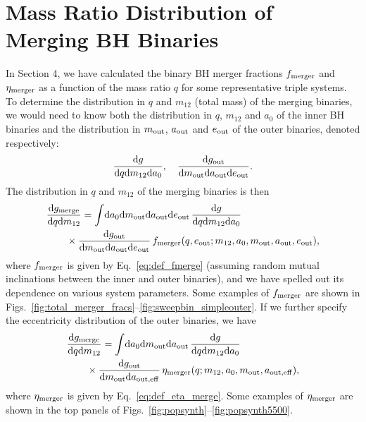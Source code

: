 \documentclass[
        fleqn,
        usenatbib,
    ]{mnras}
\newcommand*{\md}[0]{\mathrm{d}}
\begin{document}
\section{Mass Ratio Distribution of Merging BH Binaries}\label{s:q_dist}

In Section 4, we have calculated the binary BH merger fractions $f_{\rm merger}$
and $\eta_{\rm merger}$ as a function of the mass ratio $q$ for some
representative triple systems. To determine the distribution in $q$ and $m_{12}$
(total mass) of the merging binaries, we would need to know both the
distribution in $q$, $m_{12}$ and $a_0$ of the inner BH binaries and the
distribution in $m_{\rm out}$, $a_{\rm out}$ and $e_{\rm out}$ of the outer
binaries, denoted respectively:
\begin{equation}
    \frac{\md g}{ \md q \md m_{12} \md a_0},\quad
    \frac{\md g_{\rm out}}{ \md m_{\rm out} \md a_{\rm out} \md e_{\rm out}}.
\end{equation}
The distribution in $q$ and $m_{12}$ of the merging binaries is then
\begin{align}
    & {\md g_{\rm merge}\over \md q \md m_{12}} = \int \!\md a_0 \md m_{\rm
        out}\md a_{\rm out}\md e_{\rm out}\, {\md g\over \md q \md m_{12} \md
        a_0}\nonumber\\
    &\qquad \times {\md g_{\rm out}\over \md m_{\rm out} \md a_{\rm out} \md  e_{\rm out}}\,
      f_{\rm merger}(q,e_{\rm out}; m_{12},a_0,m_{\rm out},a_{\rm out},e_{\rm out}),
      \label{eq:dong1}
\end{align}
where $f_{\rm merger}$ is given by Eq.~\eqref{eq:def_fmerge} (assuming random
mutual inclinations between the inner and outer binaries), and we have spelled
out its dependence on various system parameters. Some examples of $f_{\rm
merger}$ are shown in
Figs.~\ref{fig:total_merger_fracs}--\ref{fig:sweepbin_simpleouter}. If we
further specify the eccentricity distribution of the outer binaries, we have
\begin{align}
    & {\md g_{\rm merge}\over \md q \md m_{12}} = \int
        \!\md a_0 \md m_{\rm out}\md a_{\rm out}\,
        {\md g\over \md q \md m_{12} \md a_0}\nonumber\\
    &\qquad \times {\md g_{\rm out}\over \md m_{\rm out} \md a_{\rm out,eff}}\,
        \eta_{\rm merger}(q; m_{12},a_0,m_{\rm out},a_{\rm out,eff}),
        \label{eq:dong2}
\end{align}
where $\eta_{\rm merger}$ is given by Eq.~\eqref{eq:def_eta_merge}. Some
examples of $\eta_{\rm merger}$ are shown in the top panels of
Figs.~\ref{fig:popsynth}--\ref{fig:popsynth5500}.
\end{document}
